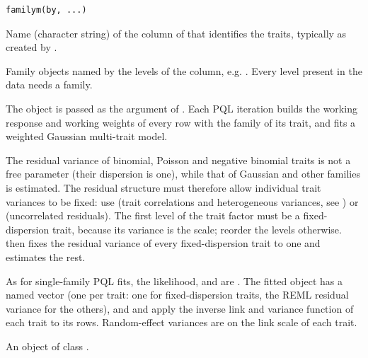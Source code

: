 \documentclass[a4paper]{book}
\begin{document}
%
\begin{Usage}
\begin{verbatim}
familym(by, ...)
\end{verbatim}
\end{Usage}
%
\begin{Arguments}
\begin{ldescription}
\item[\code{by}] Name (character string) of the column of  that
identifies the traits, typically  as created by
.
\item[\code{...}] Family objects named by the levels of the  column,
e.g. . Every level present in
the data needs a family.
\end{ldescription}
\end{Arguments}
%
\begin{Details}\relax
The object is passed as the  argument of . Each PQL
iteration builds the working response and working weights of every row with
the family of its trait, and fits a weighted Gaussian multi-trait model.

The residual variance of binomial, Poisson and negative binomial traits is not
a free parameter (their dispersion is one), while that of Gaussian and other
families is estimated. The residual structure must therefore allow individual
trait variances to be fixed: use
(trait correlations and heterogeneous variances, see ) or
 (uncorrelated residuals).
The first level of the trait factor must be a fixed-dispersion trait,
because its variance is the  scale; reorder the levels
otherwise.  then fixes the residual variance of every
fixed-dispersion trait to one and estimates the rest.

As for single-family PQL fits, the likelihood,  and  are
. The fitted object has a named  vector (one per
trait: one for fixed-dispersion traits, the REML residual variance for the
others), and  and  apply the inverse link and
variance function of each trait to its rows. Random-effect variances are on
the link scale of each trait.
\end{Details}
%
\begin{Value}
An object of class .
\end{Value}
\end{document}

